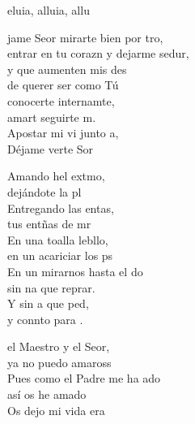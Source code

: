 \documentclass[12pt]{article}
\begin{document}
\begin{multicols*}{2}
\begin{cancion}[Alleluia 7][Taizé]%
	eluia, alluia, allu  \\
\end{cancion}%

\begin{cancion}%
	jame Seor mirarte bien por tro,\\
	entrar en tu corazn y dejarme sedur,\\
	y que aumenten mis des \\
	de querer ser como Tú\\
	conocerte internamte, \\
	amart seguirte m.\\
	Apostar mi vi junto a,\\
	Déjame verte Sor\\
	\begin{chorus}%
	Amando hel extmo, \\
	dejándote la pl\\
	Entregando las entas,  \\
	tus entñas de mr\\
	En una toalla lebllo, \\
	en un acariciar los ps\\
	En un mirarnos hasta el do \\
	sin na que reprar.\\
	Y sin a que ped, \\
	y connto para .\\
	\end{chorus}%
	 el Maestro y el Seor, \\
	ya no puedo amaross \\
	Pues como el Padre me ha ado \\
	así os he amado \\
	Os dejo mi vida era \\

\end{cancion}
\end{multicols*}
\end{document}
